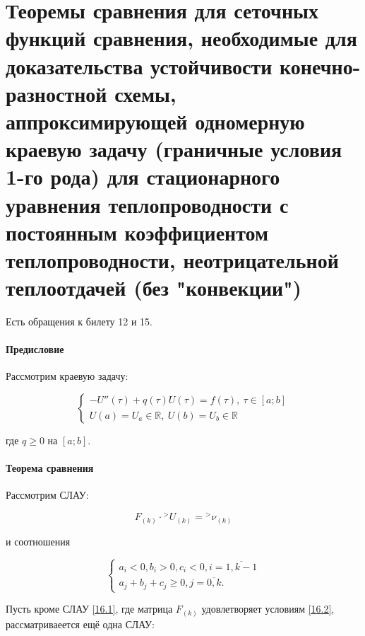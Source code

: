 \documentclass[__main__.tex]{subfiles}
\begin{document}
\section{Теоремы сравнения для сеточных функций сравнения, необходимые для доказательства устойчивости конечно-разностной схемы, аппроксимирующей одномерную краевую задачу (граничные условия 1-го рода) для стационарного уравнения теплопроводности с постоянным коэффициентом теплопроводности, неотрицательной теплоотдачей (без "конвекции")}

Есть обращения к билету 12 и 15.

\paragraph{Предисловие}

Рассмотрим краевую задачу:

\begin{equation}
\begin{cases}
-U''\left(\tau\right)+q\left(\tau\right) U \left(\tau\right) = f\left( \tau \right), \ \tau \in [a;b] \\
U\left(a\right) = U_a \in \mathbb{R}, \ U\left(b\right) = U_b \in \mathbb{R}
\end{cases}
\end{equation}

где $q \geq 0$ на $[a;b]$.

\paragraph{Теорема сравнения}

Рассмотрим СЛАУ:

\begin{equation} \label{16.1}
F_{\left(k\right)} \cdot {}^> U_{\left(k\right)} = {}^> \nu_{\left(k\right)}
\end{equation}

и соотношения

\begin{equation} \label{16.2}
\begin{cases}
a_i < 0, b_i > 0, c_i < 0, i = \overline{1,k-1} \\
a_j+b_j+c_j \geq 0, j =\overline{0,k}.
\end{cases}
\end{equation}

Пусть кроме СЛАУ \ref{16.1}, где матрица $F_{\left(k\right)}$ удовлетворяет условиям \ref{16.2}, рассматриваеется ещё одна СЛАУ:
\end{document}
